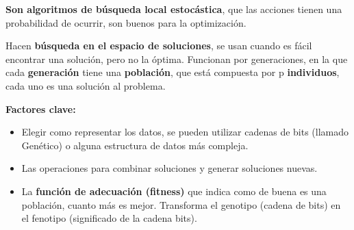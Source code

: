 \documentclass[12pt]{report} %
\begin{document}
\textbf{Son algoritmos de búsqueda local estocástica}, que las acciones tienen una probabilidad de ocurrir, son buenos para la optimización.

Hacen \textbf{búsqueda en el espacio de soluciones}, se usan cuando es fácil encontrar una solución, pero no la óptima. Funcionan por generaciones, en la que cada \textbf{generación} tiene una \textbf{población}, que está compuesta por p \textbf{individuos}, cada uno es una solución al problema.

\textbf{Factores clave:}
\begin{itemize}
  \item Elegir como representar los datos, se pueden utilizar cadenas de bits (llamado Genético) o alguna estructura de datos más compleja.
  \item Las operaciones para combinar soluciones y generar soluciones nuevas.
  \item La \textbf{función de adecuación (fitness)} que indica como de buena es una población, cuanto más es mejor. Transforma el genotipo (cadena de bits) en el fenotipo (significado de la cadena bits).
\end{itemize}
\end{document}
